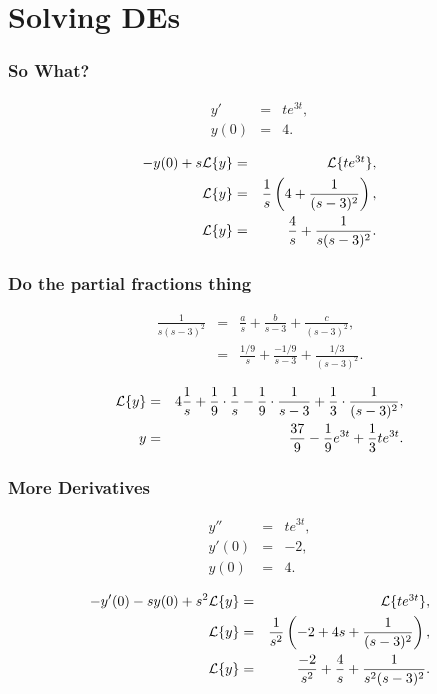 \section{Solving DEs}

\begin{frame}
  \frametitle{So What?}

  \begin{eqnarray*}
    y' & = & t e^{3t}, \\
    y(0) & = & 4.
  \end{eqnarray*}

  {
    \begin{eqnarray*}
      -y(0) + s \laplace{y} & = & \laplace{t e^{3t}}, \\
      \laplace{y} & = & \frac{1}{s} \lp 4 + \frac{1}{(s-3)^2} \rp, \\
      \laplace{y} & = & \frac{4}{s} + \frac{1}{s(s-3)^2}.
    \end{eqnarray*}
  }


\end{frame}


\begin{frame}
  \frametitle{Do the partial fractions thing}

  \begin{eqnarray*}
    \frac{1}{s(s-3)^2} & = & \frac{a}{s} + \frac{b}{s-3} + \frac{c}{(s-3)^2}, \\
    & = & \frac{1/9}{s} + \frac{-1/9}{s-3} + \frac{1/3}{(s-3)^2}.
  \end{eqnarray*}

  {
    \begin{eqnarray*}
      \laplace{y} & = & 4 \frac{1}{s} + \frac{1}{9}\cdot\frac{1}{s}  - \frac{1}{9}\cdot\frac{1}{s-3} +
      \frac{1}{3}\cdot\frac{1}{(s-3)^2}, \\
      y & = & \frac{37}{9}  - \frac{1}{9}e^{3t} + \frac{1}{3} t e^{3t}.
    \end{eqnarray*}
  }

\end{frame}


\begin{frame}
  \frametitle{More Derivatives}

  \begin{eqnarray*}
    y'' & = & t e^{3t}, \\
    y'(0) & = & -2, \\
    y(0) & = & 4.
  \end{eqnarray*}

  {
    \begin{eqnarray*}
      -y'(0) - s y(0) + s^2 \laplace{y} & = & \laplace{t e^{3t}}, \\
      \laplace{y} & = & \frac{1}{s^2} \lp -2 + 4s + \frac{1}{(s-3)^2} \rp, \\
      \laplace{y} & = & \frac{-2}{s^2} + \frac{4}{s} + \frac{1}{s^2(s-3)^2}.
    \end{eqnarray*}
  }


\end{frame}


